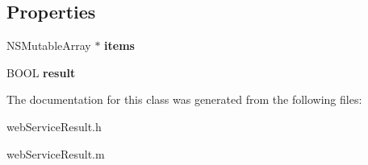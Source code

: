 \subsection*{Properties}
\begin{DoxyCompactItemize}
\item 
\hypertarget{interfaceweb_service_result_aa3723f9c17a2f3589950fff0d0d1cdf1}{}N\+S\+Mutable\+Array $\ast$ {\bfseries items}\label{interfaceweb_service_result_aa3723f9c17a2f3589950fff0d0d1cdf1}

\item 
\hypertarget{interfaceweb_service_result_a3d7ee0e5deb376491a83356ea13dafe1}{}B\+O\+O\+L {\bfseries result}\label{interfaceweb_service_result_a3d7ee0e5deb376491a83356ea13dafe1}

\end{DoxyCompactItemize}


The documentation for this class was generated from the following files\+:\begin{DoxyCompactItemize}
\item 
web\+Service\+Result.\+h\item 
web\+Service\+Result.\+m\end{DoxyCompactItemize}
